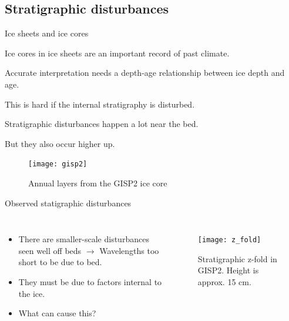 \documentclass{beamer}
\begin{document}
\subsection{Stratigraphic disturbances}
\begin{frame}{Ice sheets and ice cores}
   \begin{itemize}
\small{
\item Ice cores in ice sheets are an important record of past climate.
\item Accurate interpretation needs a depth-age relationship between ice depth and age.
\item This is hard if the internal stratigraphy is disturbed.
\item Stratigraphic disturbances happen a lot near the bed. 
\item But they also occur higher up.
}
\end{itemize}
   \begin{figure}
      \texttt{[image: gisp2]}
   \caption{Annual layers from the GISP2 ice core}
\end{figure}
\end{frame}
\begin{frame}{Observed statigraphic disturbances}
   \begin{columns}[T]
     \begin{itemize}
       \item There are smaller-scale disturbances seen well off beds
       $\rightarrow$ Wavelengths too short to be due to bed.
    \item They must be due to factors internal to the ice.
    \item What can cause this?
     \end{itemize}
     \begin{figure}
     \texttt{[image: z\_fold]}
     \caption{\small{Stratigraphic z-fold in GISP2. Height is approx. 15 cm. \citet{alley97}}}
  \end{figure}
     \end{columns}

\end{frame}
\end{document}
